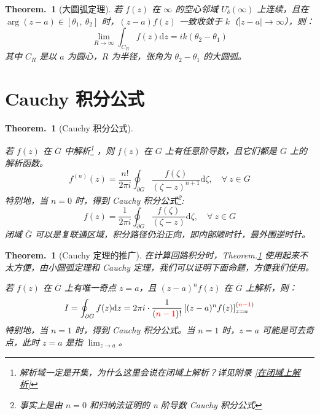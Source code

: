 \documentclass[UTF8]{report}
\theoremstyle{MyLineTheoremStyle} %
\theoremstyle{MyBlockTheoremStyle} %
\newtheorem{BlockTheorem}[LineTheorem]{Theorem.\,} %
\theoremstyle{MySubsubsectionStyle} %
\begin{document}
\begin{BlockTheorem}[大圆弧定理]\label{大圆弧定理}
    若 $f(z)$ 在 $\infty$ 的空心邻域 $U_{\delta}^\circ(\infty)$ 上连续，且在 $\arg (z - a) \in [\theta_1,\ \theta_2]$ 时，$(z-a)f(z)$ 一致收敛于 $k$（$| z - a| \to \infty$），则：
    \begin{equation}
    \lim_{R \to \infty} \int_{C_R} f(z)\mathrm{d}z = ik(\theta_2 - \theta_1)
    \end{equation}
    其中 $C_R$ 是以 $a$ 为圆心，$R$ 为半径，张角为 $\theta_2 - \theta_1$ 的大圆弧。
    \end{BlockTheorem}

\section{Cauchy 积分公式}

\begin{BlockTheorem}[Cauchy 积分公式]\label{n 阶导数 Cauchy 积分公式}

若 $f(z)$ 在 $\overline{G} $ 中解析\footnote{解析域一定是开集，为什么这里会说在闭域上解析？详见附录 \ref{在闭域上解析}} ，则 $f(z)$ 在 $G$ 上有任意阶导数，且它们都是 $\overline{G} $ 上的解析函数。
\begin{equation}
f^{(n)}(z) = \frac{n !}{2\pi i}\oint_{\partial G} \frac{f(\zeta)}{(\zeta - z)^{n+1}} \mathrm{d} \zeta,\quad \forall\ z \in G
\end{equation} 
特别地，当 $n = 0$ 时，得到 Cauchy 积分公式\footnote{事实上是由 $n = 0$ 和归纳法证明的 n 阶导数 Cauchy 积分公式}: 
\begin{equation}
    f(z) = \frac{1}{2\pi i}\oint_{\partial G} \frac{f(\zeta)}{(\zeta - z)} \mathrm{d} \zeta,\quad \forall\ z \in G
\end{equation}
闭域 $\overline{G}$ 可以是复联通区域，积分路径仍沿正向，即内部顺时针，最外围逆时针。
\end{BlockTheorem}

\begin{BlockTheorem}[Cauchy 定理的推广]\label{Cauchy 定理的推广}
在计算回路积分时，Theorem.\ref{n 阶导数 Cauchy 积分公式} 使用起来不太方便，由小圆弧定理和 Cauchy 定理，我们可以证明下面命题，方便我们使用。

若 $f(z)$ 在 $\overline{G}$ 上有唯一奇点 $z = a$，且 $(z - a)^n f(z)$ 在  $\overline{G}$ 上解析，则：
\begin{equation}
I  = \oint_{\partial G} f(z) \mathrm{d}z = 2 \pi i \cdot \frac{1}{({\color{red} n-1})!} \left[(z - a)^{n} f(z) \right]^{({\color{red} n-1})}_{z = a}
\end{equation}
特别地，当 $n = 1$ 时，得到 Cauchy 积分公式。当 $n = 1$ 时，$z = a$ 可能是可去奇点，此时 $z = a$ 是指 $\lim_{z \to a}$。
\end{BlockTheorem}
\end{document}
